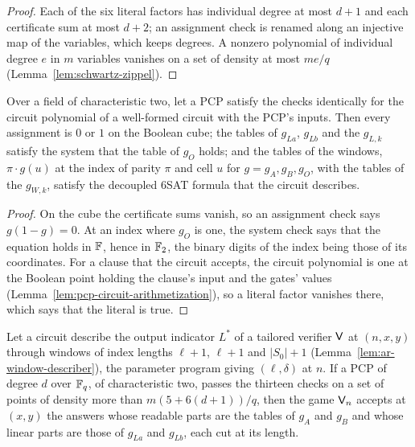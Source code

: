 \begin{proof}
\leanok
Each of the six literal factors has individual degree at most $d + 1$ and each certificate sum
at most $d + 2$; an assignment check is renamed along an injective map of the variables, which
keeps degrees. A nonzero polynomial of individual degree $e$ in $m$ variables vanishes on a set
of density at most $m e/q$ (Lemma~\ref{lem:schwartz-zippel}).
\end{proof}

\begin{lemma}
\label{lem:ar-pcp-sound}
\leanok
Over a field of characteristic two, let a PCP satisfy the checks identically for the circuit
polynomial of a well-formed circuit with the PCP's inputs. Then every assignment is $0$ or $1$ on
the Boolean cube; the tables of $g_{La}$, $g_{Lb}$ and the $g_{L,k}$ satisfy the system that the
table of $g_O$ holds; and the tables of the windows, $\pi \cdot g(u)$ at the index of parity
$\pi$ and cell $u$ for $g = g_A, g_B, g_O$, with the tables of the $g_{W,k}$, satisfy the
decoupled 6SAT formula that the circuit describes.
\end{lemma}

\begin{proof}
\leanok
On the cube the certificate sums vanish, so an assignment check says $g(1 - g) = 0$. At an index
where $g_O$ is one, the system check says that the equation holds in $\mathbb{F}$, hence in $\mathbb{F}_2$, the
binary digits of the index being those of its coordinates. For a clause that the circuit
accepts, the circuit polynomial is one at the Boolean point holding the clause's input and the
gates' values (Lemma~\ref{lem:pcp-circuit-arithmetization}), so a literal factor vanishes there,
which says that the literal is true.
\end{proof}

\begin{theorem}
\label{thm:ar-pcp-accepts}
\leanok
Let a circuit describe the output indicator $L^*$ of a tailored verifier $\mathsf{V}$ at
$(n, x, y)$ through windows of index lengths $\ell + 1$, $\ell + 1$ and $|S_0| + 1$
(Lemma~\ref{lem:ar-window-describer}), the parameter program giving $(\ell, \delta)$ at $n$. If
a PCP of degree $d$ over $\mathbb{F}_q$, of characteristic two, passes the thirteen checks on a set of
points of density more than $m (5 + 6(d + 1))/q$, then the game $\mathsf{V}_n$ accepts at
$(x, y)$ the answers whose readable parts are the tables of $g_A$ and $g_B$ and whose linear
parts are those of $g_{La}$ and $g_{Lb}$, each cut at its length.
\end{theorem}


